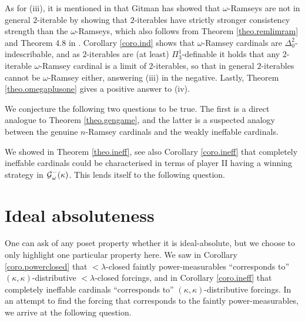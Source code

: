 \documentclass[../../main]{subfiles}
\begin{document}
\qquad As for (iii), it is mentioned in \cite{HolySchlicht} that Gitman has showed that $\omega$-Ramseys are not in general $2$-iterable by showing that $2$-iterables have strictly stronger consistency strength than the $\omega$-Ramseys, which also follows from Theorem \ref{theo.remlimram} and Theorem 4.8 in \cite{Ramsey2}. Corollary \ref{coro.ind} shows that $\omega$-Ramsey cardinals are $\Delta^2_0$-indescribable, and as $2$-iterables are (at least) $\Pi^1_3$-definable it holds that any $2$-iterable $\omega$-Ramsey cardinal is a limit of $2$-iterables, so that in general $2$-iterables cannot be $\omega$-Ramsey either, answering (iii) in the negative. Lastly, Theorem \ref{theo.omegaplusone} gives a positive answer to (iv).

\qquad We conjecture the following two questions to be true. The first is a direct analogue to Theorem \ref{theo.gengame}, and the latter is a suspected analogy between the genuine $n$-Ramsey cardinals and the weakly ineffable cardinals.



We showed in Theorem \ref{theo.ineff}, see also Corollary \ref{coro.ineff} that completely ineffable cardinals could be characterised in terms of player II having a winning strategy in $\operatorname{\mathcal G}_\omega^-(\kappa)$. This lends itself to the following question.



\section{Ideal absoluteness}

One can ask of any poset property whether it is ideal-absolute, but we choose to only highlight one particular property here. We saw in Corollary \ref{coro.powerclosed} that ${<}\lambda$-closed faintly power-measurables ``corresponds to'' $(\kappa,\kappa)$-distributive ${<}\lambda$-closed forcings, and in Corollary \ref{coro.ineff} that completely ineffable cardinals ``corresponds to'' $(\kappa,\kappa)$-distributive forcings. In an attempt to find the forcing that corresponds to the faintly power-measurables, we arrive at the following question.
\end{document}
